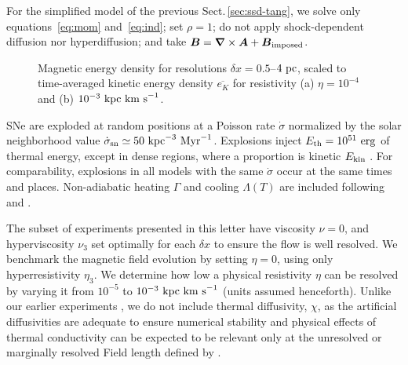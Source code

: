 \documentclass[preprint2]{aastex63}
\newcommand\SNr{\dot\sigma_{\rm sn}}
\newcommand\ESK{E_{\rm kin}}
\newcommand\EST{E_{\rm th}}
\newcommand{\vect}[1]{{{\mbox{\boldmath $#1$}}}}%
\newcommand\kpc{~ {\rm kpc}}
\newcommand\pc{~ {\rm pc}}
\newcommand\dx{ {\delta x}}
\newcommand\Myr{~ {\rm Myr}}
\newcommand\erg{~ {\rm erg}}
\newcommand\kms{~ {\rm km~ s}^{-1}}
\newcommand{\fg}[1]{\textcolor{midblue}{#1}}
\begin{document}
 \fg{For the simplified model of the previous}
 Sect.\,\ref{sec:ssd-tang}, we solve only equations~\eqref{eq:mom}
 and~\eqref{eq:ind}; set $\rho=1$; do not apply shock-dependent diffusion nor
 hyperdiffusion; and take $\vect{B}=\vect\nabla\times\vect{A}+
 \vect{B}_{\rm imposed}$.

\begin{figure*}
\caption{
 Magnetic energy density for resolutions $\dx=0.5$--$4\pc$,
 scaled to time-averaged kinetic energy density $\overline{e_K}$ for resistivity
 (a) $\eta=10^{-4}$ and (b) $10^{-3}\kpc\kms$.
\label{fig:eb-res}}
\end{figure*}

 SNe are exploded at random positions at a Poisson rate $\dot\sigma$
 normalized by the solar neighborhood value $\SNr\simeq 50\kpc^{-3}\Myr^{-1}$.
 Explosions inject $\EST = 10^{51}\erg$ of thermal energy, except in
 dense regions, where a proportion is kinetic $\ESK$ 
 \citep[see][]{GMKSH20}.
 For comparability, explosions in all models with the same $\dot\sigma$ occur
 at the same times and places.
 Non-adiabatic heating $\Gamma$ and cooling $\Lambda (T)$ are included
 \citep{Gent:2013a} following \citet{Wolfire:1995} and \citet{Sarazin:1987}.

 The subset of experiments presented in this letter have viscosity $\nu=0$,
 and hyperviscosity $\nu_3$ set optimally for each $\dx$ to ensure the flow
 is well resolved.
 We benchmark the magnetic field evolution by setting $\eta=0$, using only
 hyperresistivity $\eta_3$.
 We determine how low a physical resistivity $\eta$ can be resolved by varying
 it from $10^{-5}$ to $10^{-3}\kpc\kms$ (units assumed henceforth).
 Unlike our earlier experiments \citep{Gent:2013a,Gent:2013b,GMKSH20},
 we do not include thermal diffusivity, $\chi$, as the artificial diffusivities
 are adequate to ensure numerical stability and physical effects of thermal
 conductivity can be expected to be relevant only at the unresolved or
 marginally resolved Field length defined by \citet[][named after George
 Field, not the magnetic field]{BM90}.
\end{document}
